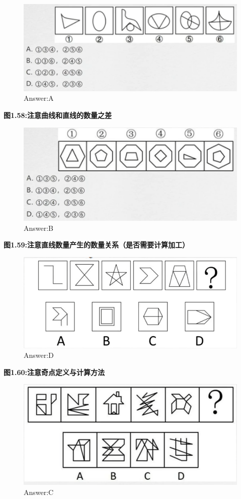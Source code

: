 \documentclass{article}
\numberwithin{equation}{section}						%
\numberwithin{figure}{section}							%
\begin{document}
\begin{sloppypar}
\begin{figure}[H]
     \centering
     \includegraphics[width=0.6\linewidth]{61.png}
		\caption{Answer:A}
\end{figure}

\textbf{图1.58:注意曲线和直线的数量之差}

\begin{figure}[H]
     \centering
     \includegraphics[width=0.6\linewidth]{62.png}
		\caption{Answer:B}
\end{figure}

\textbf{图1.59:注意直线数量产生的数量关系（是否需要计算加工）}

\begin{figure}[H]
     \centering
     \includegraphics[width=0.6\linewidth]{63.png}
		\caption{Answer:D}
\end{figure}

\textbf{图1.60:注意奇点定义与计算方法}

\begin{figure}[H]
     \centering
     \includegraphics[width=0.6\linewidth]{64.png}
		\caption{Answer:C}
\end{figure}



\end{sloppypar}
\end{document}
